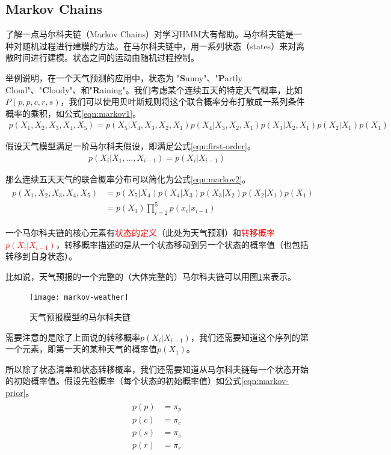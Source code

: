 \subsection{Markov Chains} 
了解一点马尔科夫链（Markov Chains）对学习HMM大有帮助。马尔科夫链是一种对随机过程进行建模的方法。在马尔科夫链中，用一系列状态（states）来对离散时间进行建模。状态之间的运动由随机过程控制。

举例说明，在一个天气预测的应用中，状态为 "{\bf S}unny"、"{\bf P}artly Cloud"、"{\bf C}loudy"、和"{\bf R}aining"。我们考虑某个连续五天的特定天气概率，比如$P(p,p,c,r,s)$，我们可以使用贝叶斯规则将这个联合概率分布打散成一系列条件概率的乘积，如公式\ref{eqn:markov1}。
\begin{align}
\label{eqn:markov1}
	p(X_1, X_2, X_3, X_4, X_5)=p(X_5 | X_4, X_3, X_2, X_1) p(X_4 | X_3, X_2, X_1) p(X_3 | X_2, X_1) p(X_2 | X_1) p(X_1)
\end{align}

假设天气模型满足一阶马尔科夫假设，即满足公式\ref{eqn:first-order}。
\begin{align}
\label{eqn:first-order}
	p(X_i |X_1, ..., X_{i-1})=p(X_i | X_{i-1})
\end{align}

那么连续五天天气的联合概率分布可以简化为公式\ref{eqn:markov2}。
\begin{align}
\label{eqn:markov2}
\begin{split}
	p(X_1, X_2, X_3, X_4, X_5)
			&= p(X_5 | X_4) p(X_4 | X_3) p(X_3 | X_2) p(X_2 | X_1) p(X_1) \\
			&= p(X_1)\prod_{i=2}^{5}p(x_i|x_{i-1})
\end{split}
\end{align}

一个马尔科夫链的核心元素有\textcolor{red}{状态的定义}（此处为天气预测）和\textcolor{red}{转移概率$p(X_i|X_{i-1})$}，转移概率描述的是从一个状态移动到另一个状态的概率值（也包括转移到自身状态）。

比如说，天气预报的一个完整的（大体完整的）马尔科夫链可以用图\ref{fig:markov-weather}来表示。
\begin{figure}[htbp]
	\centering
	\texttt{[image: markov-weather]}
	\caption{天气预报模型的马尔科夫链\label{fig:markov-weather}}
\end{figure}

需要注意的是除了上面说的转移概率$p(X_i|X_{i-1})$，我们还需要知道这个序列的第一个元素，即第一天的某种天气的概率值$p(X_1)$。

所以除了状态清单和状态转移概率，我们还需要知道从马尔科夫链每一个状态开始的初始概率值。假设先验概率（每个状态的初始概率值）如公式\ref{eqn:markov-prior}。
\begin{align}
\label{eqn:markov-prior}
\begin{split}
	p(p) &= \pi_{p} \\
	p(c) &= \pi_{c} \\
	p(s) &= \pi_{s} \\
	p(r) &= \pi_{r}
\end{split}
\end{align}

